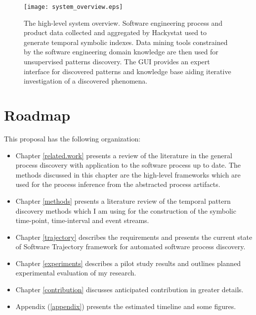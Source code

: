\begin{figure}[tbp]
   \centering
   \texttt{[image: system\_overview.eps]}
   \caption{The high-level system overview. Software engineering process and product data collected and aggregated by Hackystat used to generate temporal symbolic indexes. Data mining tools constrained by the software engineering domain knowledge are then used for unsupervised patterns discovery. The GUI provides an expert interface for discovered patterns and knowledge base aiding iterative investigation of a discovered phenomena.}
   \label{fig:system_overview}
\end{figure}

\section{Roadmap}
This proposal has the following organization:
\begin{itemize}
	\item Chapter \ref{related.work} presents a review of the literature in the general process discovery with application to the software process up to date. The methods discussed in this chapter are the high-level frameworks which are used for the process inference from the abstracted process artifacts.
	\item Chapter \ref{methods} presents a literature review of the temporal pattern discovery methods which I am using for the construction of the symbolic time-point, time-interval and event streams.
	\item Chapter \ref{trajectory} describes the requirements and presents the current state of Software Trajectory framework for automated software process discovery.
	\item Chapter \ref{experiments} describes a pilot study results and outlines planned experimental evaluation of my research.
	\item Chapter \ref{contribution} discusses anticipated contribution in greater details.
	\item Appendix (\ref{appendix}) presents the estimated timeline and some figures.
\end{itemize}
